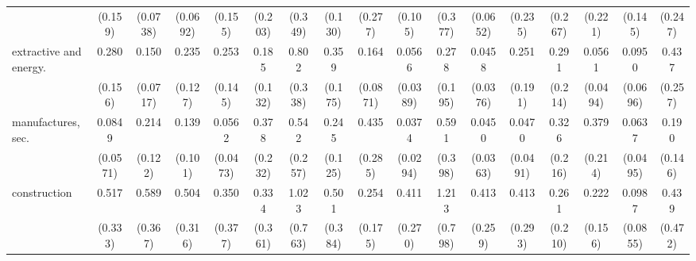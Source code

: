 {\begin{tabular}{l*{16}{c}}
                    &     (0.159)         &    (0.0738)         &    (0.0692)         &     (0.155)         &     (0.203)         &     (0.349)         &     (0.130)         &     (0.277)         &     (0.105)         &     (0.377)         &    (0.0652)         &     (0.235)         &     (0.267)         &     (0.221)         &     (0.145)         &     (0.247)         \\
[1em]
extractive and energy.&       0.280\sym{*}  &       0.150\sym{***}&       0.235\sym{**} &       0.253\sym{*}  &       0.185\sym{*}  &       0.802         &       0.359\sym{*}  &       0.164\sym{***}&      0.0566\sym{***}&       0.278         &      0.0458\sym{***}&       0.251         &       0.291         &      0.0561\sym{**} &      0.0950\sym{**} &       0.437         \\
                    &     (0.156)         &    (0.0717)         &     (0.127)         &     (0.145)         &     (0.132)         &     (0.338)         &     (0.175)         &    (0.0871)         &    (0.0389)         &     (0.195)         &    (0.0376)         &     (0.191)         &     (0.214)         &    (0.0494)         &    (0.0696)         &     (0.257)         \\
[1em]
manufactures, sec.  &      0.0849\sym{***}&       0.214\sym{**} &       0.139\sym{**} &      0.0562\sym{***}&       0.378         &       0.542         &       0.245\sym{**} &       0.435         &      0.0374\sym{***}&       0.591         &      0.0450\sym{***}&      0.0470\sym{**} &       0.326         &       0.379         &      0.0637\sym{***}&       0.190\sym{*}  \\
                    &    (0.0571)         &     (0.122)         &     (0.101)         &    (0.0473)         &     (0.232)         &     (0.257)         &     (0.125)         &     (0.285)         &    (0.0294)         &     (0.398)         &    (0.0363)         &    (0.0491)         &     (0.216)         &     (0.214)         &    (0.0495)         &     (0.146)         \\
[1em]
construction        &       0.517         &       0.589         &       0.504         &       0.350         &       0.334         &       1.023         &       0.501         &       0.254\sym{*}  &       0.411         &       1.213         &       0.413         &       0.413         &       0.261         &       0.222\sym{*}  &      0.0987\sym{**} &       0.439         \\
                    &     (0.333)         &     (0.367)         &     (0.316)         &     (0.377)         &     (0.361)         &     (0.763)         &     (0.384)         &     (0.175)         &     (0.270)         &     (0.798)         &     (0.259)         &     (0.293)         &     (0.210)         &     (0.156)         &    (0.0855)         &     (0.472)         \\

\end{tabular}}
